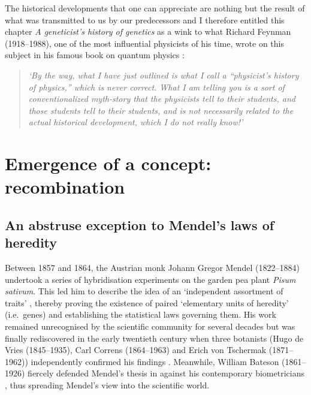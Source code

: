 The historical developments that one can appreciate are nothing but the result of what was transmitted to us by our predecessors and I therefore entitled this chapter \textit{A geneticist's history of genetics} as a wink to what Richard Feynman (1918--1988), one of the most influential physicists of his time, wrote on this subject in his famous book on quantum physics \textit{} \citeyearpar{feynman2006qed}:

\begin{quote}
	\textit{‘By the way, what I have just outlined is what I call a “physicist’s history of physics,” which is never correct. What I am telling you is a sort of conventionalized myth-story that the physicists tell to their students, and those students tell to their students, and is not necessarily related to the actual historical development, which I do not really know!’}
\end{quote}






\section{Emergence of a concept: recombination}

\subsection{An abstruse exception to Mendel's laws of heredity}

Between 1857 and 1864, the Austrian monk Johann Gregor Mendel (1822--1884) undertook a series of hybridisation experiments on the garden pea plant \textit{Pisum sativum}. This led him to describe the idea of an ‘independent assortment of traits’ \citep{mendel1996experiments}, thereby proving the existence of paired ‘elementary units of heredity’ (i.e.\ genes) and establishing the statistical laws governing them.
His work remained unrecognised by the scientific community for several decades but was finally rediscovered in the early twentieth century when three botanists (Hugo de Vries (1845--1935), Carl Correns (1864--1963) and Erich von Tschermak (1871--1962)) independently confirmed his findings \citep{dunn2003gregor}.
Meanwhile, William Bateson (1861--1926) fiercely defended Mendel's thesis in \textit{} \citep{bateson1902mendel} against his contemporary biometricians \citep[reviewed in][]{bateson2002william}, thus spreading Mendel's view into the scientific world.\\

